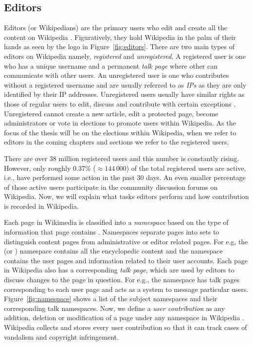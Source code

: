 \subsection{Editors}
Editors (or Wikipedians) are the primary users who edit and create all the content on Wikipedia \cite{wiki:editors}. Figuratively, they hold Wikipedia in the palm of their hands as seen by the logo in Figure~\ref{fig:editors}. There are two main types of editors on Wikipedia namely, \textit{registered} and \textit{unregistered}. A registered user is one who has a unique username and a permanent \textit{talk page} where other can communicate with other users. An unregistered user is one who contributes without a registered username and are usually referred to as \textit{IPs} as they are only identified by their IP addresses. Unregistered users usually have similar rights as those of regular users to edit, discuss and contribute with certain exceptions 
\cite{wiki:unregistered-users}. Unregistered cannot create a new article, edit a protected page, become administrators or vote in elections to promote users within Wikipedia. As the focus of the thesis will be on the elections within Wikipedia, when we refer to editors in the coming chapters and sections we refer to the registered users.

There are over 38 million registered users and this number is constantly rising. However, only roughly $0.37\%$ ($\approx 144\,000$) of the total registered users are active, i.e., have performed some action in the past 30 days. An even smaller percentage of those active users participate in the community discussion forums on Wikipedia. Now, we will explain what tasks editors perform and how contribution is recorded in Wikipedia.

Each page in Wikimedia is classified into a \textit{namespace} based on the type of information that page contains \cite{wiki:namespace}. Namespaces separate pages into sets to distinguish content pages from administrative or editor related pages. For e.g, the \mainNS (or \articleNS) namespace contains all the encyclopedic content and the \userNS namespace contains the user pages and information related to their user accounts. Each page in Wikipedia also has a corresponding \textit{talk page}, which are used by editors to discuss changes to the page in question. For e.g., the \usertalkNS namespace has talk pages corresponding to each user page and acts as a system to message particular users. Figure~\ref{fig:namespace} shows a list of the subject namespaces and their corresponding talk namespaces. Now, we define a \textit{user contribution} as any addition, deletion or modification of a page under any namespace in Wikipedia \cite{wiki:user-contribs}. Wikipedia collects and stores every user contribution so that it can track cases of vandalism and copyright infringement. 

